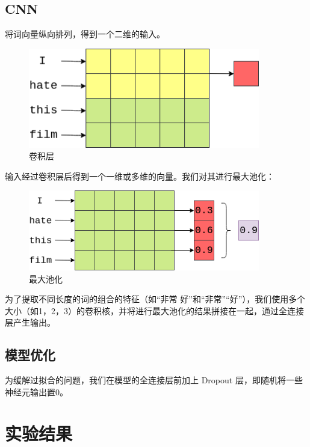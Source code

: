 \documentclass[a4paper]{article}
\begin{document}
\subsection{CNN}

将词向量纵向排列，得到一个二维的输入。

\begin{figure}[H]
    \centering
    \includegraphics[width=0.9\textwidth]{assets/cnn-1.png}
    \caption{卷积层}
\end{figure}

输入经过卷积层后得到一个一维或多维的向量。我们对其进行最大池化：

\begin{figure}[H]
    \centering
    \includegraphics[width=0.9\textwidth]{assets/cnn-2.png}
    \caption{最大池化}
\end{figure}

为了提取不同长度的词的组合的特征（如“非常 好”和“非常”“好”），我们使用多个大小（如1，2，3）的卷积核，并将进行最大池化的结果拼接在一起，通过全连接层产生输出。

\subsection{模型优化}

为缓解过拟合的问题，我们在模型的全连接层前加上 Dropout 层，即随机将一些神经元输出置0。

\section{实验结果}
\end{document}
